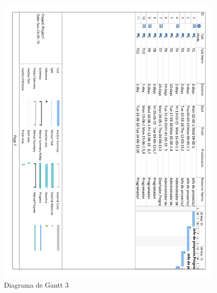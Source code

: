 \begin{figure}[!htp]
	\centering
	\includegraphics[page=3, scale=.7]{fig/gantt_diagram}
	\caption{Diagrama de Gantt 3}
\end{figure}

